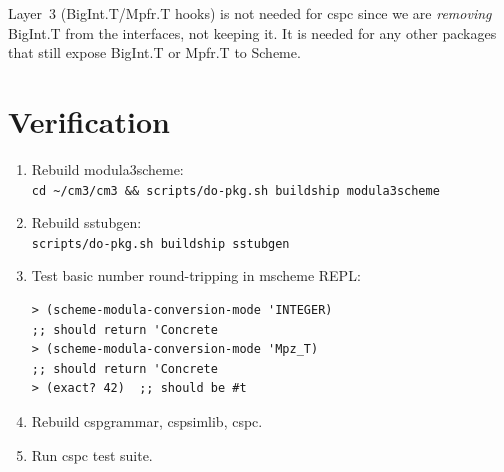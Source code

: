 \documentclass[11pt]{article}
\begin{document}
Layer~3 (BigInt.T/Mpfr.T hooks) is not needed for cspc since we are
\emph{removing} BigInt.T from the interfaces, not keeping it.  It is
needed for any other packages that still expose BigInt.T or Mpfr.T to
Scheme.

\section{Verification}

\begin{enumerate}
\item Rebuild modula3scheme: \\
  \texttt{cd \~{}/cm3/cm3 \&\& scripts/do-pkg.sh buildship modula3scheme}
\item Rebuild sstubgen: \\
  \texttt{scripts/do-pkg.sh buildship sstubgen}
\item Test basic number round-tripping in mscheme REPL:
\begin{lstlisting}
> (scheme-modula-conversion-mode 'INTEGER)
;; should return 'Concrete
> (scheme-modula-conversion-mode 'Mpz_T)
;; should return 'Concrete
> (exact? 42)  ;; should be #t
\end{lstlisting}
\item Rebuild cspgrammar, cspsimlib, cspc.
\item Run cspc test suite.
\end{enumerate}
\end{document}
